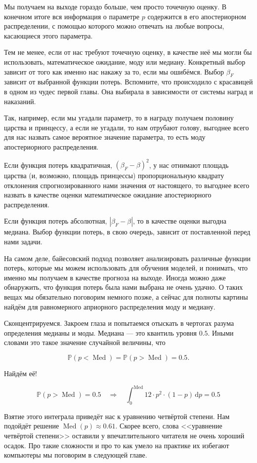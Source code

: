 \documentclass[12pt, a4paper, oneside]{extreport}
\DeclareMathOperator{\Med}{Med}
\def \mbb{\mathbb}
\def \PP{\mbb{P}}
\newcommand{\dx}[1]{\,\mathrm{d}#1} %
\theoremstyle{plain}              %
\theoremstyle{definition}         %
\begin{document}
Мы получаем на выходе гораздо больше, чем просто точечную оценку. В конечном итоге вся информация о параметре $p$ содержится в его апостериорном распределении, с помощью которого можно отвечать на любые вопросы, касающиеся этого параметра. 

Тем не менее, если от нас требуют точечную оценку, в качестве неё мы могли бы использовать, математическое ожидание, моду или медиану. Конкретный выбор зависит от того как именно нас накажу за то, если мы ошибёмся. Выбор $\beta_F$ зависит от выбранной функции потерь. Вспомните, что происходило с красавицей в одном из чудес первой главы. Она выбирала в зависимости от системы наград и наказаний. 

Так, например, если мы угадали параметр, то в награду получаем половину царства и принцессу, а если не угадали, то нам отрубают голову, выгоднее всего для нас назвать самое вероятное значение параметра, то есть моду апостериорного распределения. 

Если функция потерь квадратичная, $(\beta_F - \beta)^2$, у нас отнимают площадь царства (и, возможно, площадь принцессы) пропорциональную квадрату отклонения спрогнозированного нами значения от настоящего, то выгоднее всего назвать в качестве оценки математическое ожидание апостериорного распределения.

Если функция потерь абсолютная, $|\beta_F - \beta|$, то в качестве оценки выгодна медиана. Выбор функции потерь, в свою очередь, зависит от поставленной перед нами задачи.

На самом деле, байесовский подход позволяет анализировать различные функции потерь, которые мы можем использовать для обучения моделей, и понимать, что именно мы получаем в качестве прогноза на выходе. Иногда можно даже обнаружить, что функция потерь была нами выбрана не очень удачно. О таких вещах мы обязательно поговорим немного позже, а сейчас для полноты картины найдём для равномерного априорного распределения моду и медиану.

Сконцентрируемся. Закроем глаза и попытаемся отыскать в чертогах разума определения медианы и моды.  Медиана --- это квантиль уровня $0.5$. Иными словами это такое значение случайной величины, что 

\[\PP(p < \Med) = \PP(p > \Med) = 0.5.\]

 Найдём её!

\[ \PP(p > \Med) = 0.5 \quad \Rightarrow \quad \int_0^{\Med} 12 \cdot p^2 \cdot (1-p) \dx{p} = 0.5  \]

Взятие этого интеграла приведёт нас к уравнению четвёртой степени. Нам подойдёт решение $\Med(p) \approx 0.61 $. Скорее всего, слова <<уравнение четвёртой степени>> оставили у впечатлительного  читателя не очень хороший осадок. Про такие сложности и про то как умело на практике их избегают компьютеры мы поговорим в следующей главе. 
\end{document}
